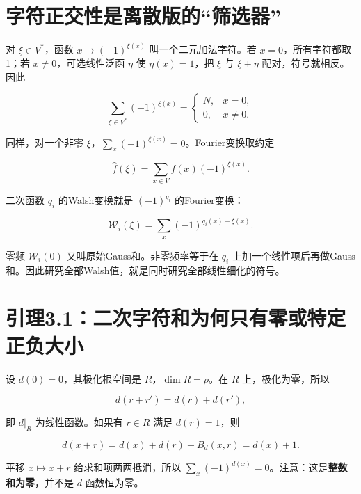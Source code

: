 \documentclass[UTF8,fontset=fandol,zihao=-4,openany,oneside]{ctexbook}
\begin{document}
\section{字符正交性是离散版的“筛选器”}


对 \(\xi\in V^*\)，函数 \(x\mapsto(-1)^{\xi(x)}\) 叫一个二元加法字符。若 \(x=0\)，所有字符都取1；若 \(x\ne0\)，可选线性泛函 \(\eta\) 使 \(\eta(x)=1\)，把 \(\xi\) 与 \(\xi+\eta\) 配对，符号就相反。因此



\[
\sum_{\xi\in V^*}(-1)^{\xi(x)}=
\begin{cases}N,&x=0,\\0,&x\ne0.\end{cases}
\]



同样，对一个非零 \(\xi\)，\(\sum_x(-1)^{\xi(x)}=0\)。Fourier变换取约定



\[
\widehat f(\xi)=\sum_{x\in V}f(x)(-1)^{\xi(x)}.
\]



二次函数 \(q_i\) 的Walsh变换就是 \((-1)^{q_i}\) 的Fourier变换：



\[
\mathcal W_i(\xi)=\sum_x(-1)^{q_i(x)+\xi(x)}.
\]



零频 \(\mathcal W_i(0)\) 又叫原始Gauss和。非零频率等于在 \(q_i\) 上加一个线性项后再做Gauss和。因此研究全部Walsh值，就是同时研究全部线性细化的符号。



\section{引理3.1：二次字符和为何只有零或特定正负大小}


设 \(d(0)=0\)，其极化根空间是 \(R\)，\(\dim R=\rho\)。在 \(R\) 上，极化为零，所以



\[
d(r+r')=d(r)+d(r'),
\]



即 \(d|_R\) 为线性函数。如果有 \(r\in R\) 满足 \(d(r)=1\)，则



\[
d(x+r)=d(x)+d(r)+B_d(x,r)=d(x)+1.
\]



平移 \(x\mapsto x+r\) 给求和项两两抵消，所以 \(\sum_x(-1)^{d(x)}=0\)。注意：这是\textbf{整数和为零}，并不是 \(d\) 函数恒为零。
\end{document}
